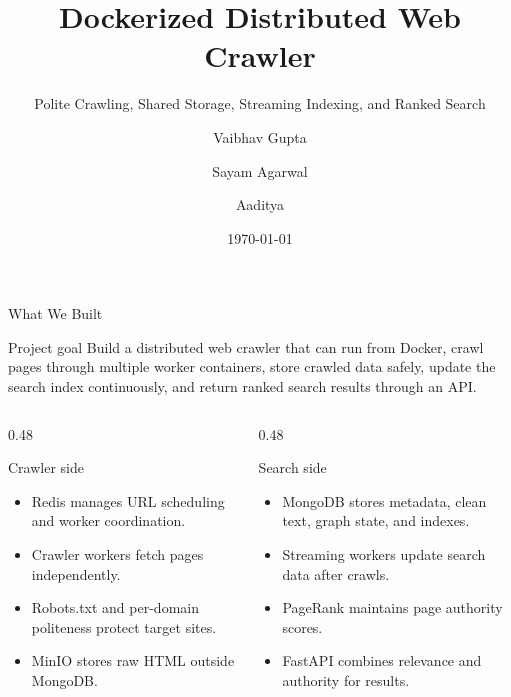 \documentclass[aspectratio=169,11pt]{beamer}
\title[Distributed Web Crawler]{Dockerized Distributed Web Crawler}
\subtitle{Polite Crawling, Shared Storage, Streaming Indexing, and Ranked Search}
\author[Vaibhav, Sayam, Aaditya]{Vaibhav Gupta \and Sayam Agarwal \and Aaditya}
\institute{Project Evaluation Presentation}
\date{\today}
\begin{document}
\begin{frame}
  \titlepage
\end{frame}

\begin{frame}{What We Built}
  \small
  \begin{block}{Project goal}
    Build a distributed web crawler that can run from Docker, crawl pages through multiple worker containers, store crawled data safely, update the search index continuously, and return ranked search results through an API.
  \end{block}

  \begin{columns}[T,totalwidth=\textwidth]
    \begin{column}{0.48\textwidth}
      \begin{block}{Crawler side}
        \begin{itemize}
          \item Redis manages URL scheduling and worker coordination.
          \item Crawler workers fetch pages independently.
          \item Robots.txt and per-domain politeness protect target sites.
          \item MinIO stores raw HTML outside MongoDB.
        \end{itemize}
      \end{block}
    \end{column}
    \begin{column}{0.48\textwidth}
      \begin{block}{Search side}
        \begin{itemize}
          \item MongoDB stores metadata, clean text, graph state, and indexes.
          \item Streaming workers update search data after crawls.
          \item PageRank maintains page authority scores.
          \item FastAPI combines relevance and authority for results.
        \end{itemize}
      \end{block}
    \end{column}
  \end{columns}
\end{frame}
\end{document}
